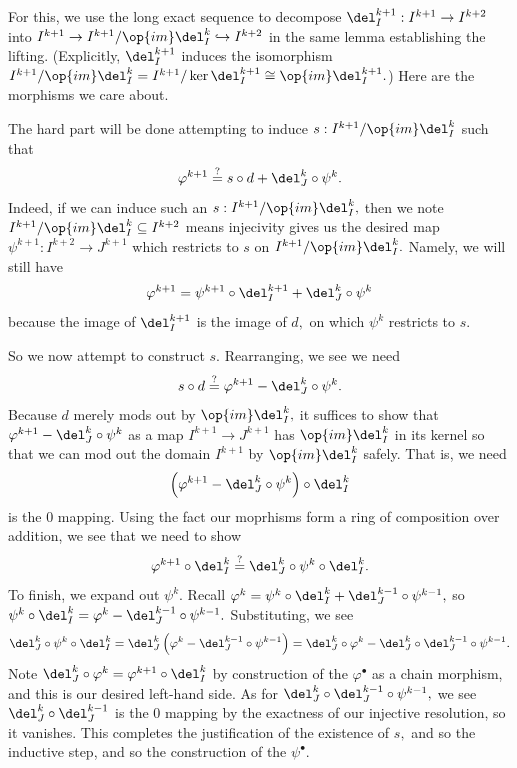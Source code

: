 For this, we use the long exact sequence to decompose $\del_I^{k+1}:I^{k+1}\to I^{k+2}$ into $I^{k+1}\to I^{k+1}/\op{im}\del_I^k\hookrightarrow I^{k+2}$ in the same lemma establishing the lifting. (Explicitly, $\del_I^{k+1}$ induces the isomorphism $I^{k+1}/\op{im}\del_I^k=I^{k+1}/\ker\del_I^{k+1}\cong\op{im}\del_I^{k+1}.$) Here are the morphisms we care about.
\begin{center}
\end{center}
The hard part will be done attempting to induce $s:I^{k+1}/\op{im}\del_I^k$ such that
\[\varphi^{k+1}\stackrel?=s\circ d+\del_J^k\circ\psi^k.\]
Indeed, if we can induce such an $s:I^{k+1}/\op{im}\del_I^k,$ then we note $I^{k+1}/\op{im}\del_I^k\subseteq I^{k+2}$ means injecivity gives us the desired map $\psi^{k+1}:I^{k+2}\to J^{k+1}$ which restricts to $s$ on $I^{k+1}/\op{im}\del_I^k.$ Namely, we will still have
\[\varphi^{k+1}=\psi^{k+1}\circ\del_I^{k+1}+\del_J^k\circ\psi^k\]
because the image of $\del_I^{k+1}$ is the image of $d,$ on which $\psi^k$ restricts to $s.$

So we now attempt to construct $s.$ Rearranging, we see we need
\[s\circ d\stackrel?=\varphi^{k+1}-\del_J^k\circ\psi^k.\]
Because $d$ merely mods out by $\op{im}\del_I^k,$ it suffices to show that $\varphi^{k+1}-\del_J^k\circ\psi^k$ as a map $I^{k+1}\to J^{k+1}$ has $\op{im}\del_I^k$ in its kernel so that we can mod out the domain $I^{k+1}$ by $\op{im}\del_I^k$ safely. That is, we need
\[\left(\varphi^{k+1}-\del_J^k\circ\psi^k\right)\circ\del_I^k\]
is the $0$ mapping. Using the fact our moprhisms form a ring of composition over addition, we see that we need to show
\[\varphi^{k+1}\circ\del_I^k\stackrel?=\del_J^k\circ\psi^k\circ\del_I^k.\]
To finish, we expand out $\psi^k.$ Recall $\varphi^k=\psi^k\circ\del_I^k+\del_J^{k-1}\circ\psi^{k-1},$ so $\psi^k\circ\del_I^k=\varphi^k-\del_J^{k-1}\circ\psi^{k-1}.$ Substituting, we see
\[\del_J^k\circ\psi^k\circ\del_I^k=\del_J^k\left(\varphi^k-\del_J^{k-1}\circ\psi^{k-1}\right)=\del_J^k\circ\varphi^k-\del_J^k\circ\del_J^{k-1}\circ\psi^{k-1}.\]
Note $\del_J^k\circ\varphi^k=\varphi^{k+1}\circ\del_I^k$ by construction of the $\varphi^\bullet$ as a chain morphism, and this is our desired left-hand side. As for $\del_J^k\circ\del_J^{k-1}\circ\psi^{k-1},$ we see $\del_J^k\circ\del_J^{k-1}$ is the $0$ mapping by the exactness of our injective resolution, so it vanishes. This completes the justification of the existence of $s,$ and so the inductive step, and so the construction of the $\psi^\bullet.$

